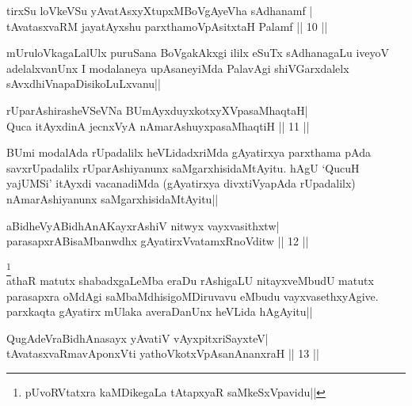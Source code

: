 
\begin{shl}
tirxSu loVkeVSu yAvatAsxyXtupxMBoVgAyeVha sAdhanamf | \\
tAvatasxvaRM jayatAyxshu parxthamoVpAsitxtaH Palamf \hfill ||  10 ||
\end{shl}

\begin{artha} 
mUruloVkagaLalUlx puruSana BoVgakAkxgi ililx eSuTx sAdhanagaLu iveyoV 
adelalxvanUnx I modalaneya upAsaneyiMda PalavAgi shiVGarxdalelx 
sAvxdhiVnapaDisikoLuLxvanu||
\end{artha}


\begin{shl}
rUparAshirasheVSeVNa BUmAyxduyxkotxyXVpasaMhaqtaH| \\
Quca itAyxdinA jecnxVyA nAmarAshuyxpasaMhaqtiH \hfill ||  11 || 
\end{shl}

\begin{artha} 
BUmi modalAda rUpadalilx heVLidadxriMda gAyatirxya parxthama pAda 
savxrUpadalilx rUparAshiyanunx saMgarxhisidaMtAyitu. hAgU `QucuH 
yajUMSi' itAyxdi vacanadiMda (gAyatirxya divxtiVyapAda rUpadalilx) 
nAmarAshiyanunx saMgarxhisidaMtAyitu||
\end{artha}


\begin{shl}
aBidheVyABidhAnAKayxrAshiV nitwyx vayxvasithxtw| \\
parasapxrABisaMbanwdhx gAyatirxVvatamxRnoVditw \hfill ||  12 ||
\end{shl}

\begin{artha} 
\footnote[1]{pUvoRVtatxra kaMDikegaLa tAtapxyaR saMkeSxVpavidu||}\\
athaR matutx shabadxgaLeMba eraDu rAshigaLU nitayxveMbudU matutx 
parasapxra oMdAgi saMbaMdhisigoMDiruvavu eMbudu vayxvasethxyAgive. 
parxkaqta gAyatirx mUlaka averaDanUnx heVLida hAgAyitu||
\end{artha}


\begin{shl}
QugAdeVraBidhAnasayx yAvatiV vAyxpitxriSayxteV| \\
tAvatasxvaRmavAponxVti yathoVkotxVpAsanAnanxraH \hfill ||  13 || 
\end{shl}

